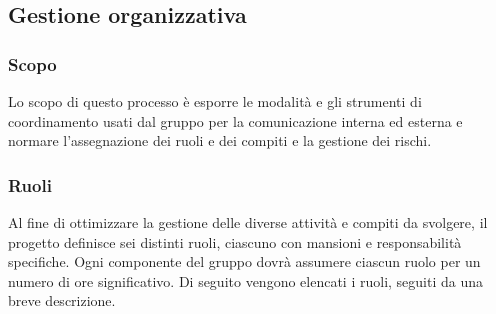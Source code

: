 \documentclass[10pt, a4paper]{article}
\begin{document}
\subsection{Gestione organizzativa}
\subsubsection{Scopo}
Lo scopo di questo processo è esporre le modalità e gli strumenti di coordinamento usati dal gruppo per la comunicazione interna ed esterna e normare l'assegnazione dei ruoli e dei compiti e la gestione dei rischi.

\subsubsection{Ruoli}
Al fine di ottimizzare la gestione delle diverse attività e compiti da svolgere, il progetto definisce sei distinti ruoli, ciascuno con mansioni e responsabilità specifiche.
Ogni componente del gruppo dovrà assumere ciascun ruolo per un numero di ore significativo.
Di seguito vengono elencati i ruoli, seguiti da una breve descrizione.
\end{document}
